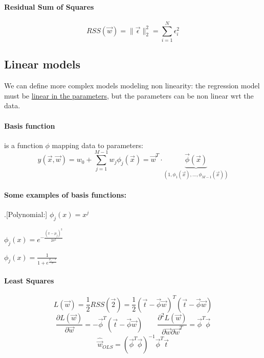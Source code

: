 \documentclass{article}
\begin{document}
\paragraph{Residual Sum of Squares}
\[
RSS(\vec{w})=\|\vec{\epsilon}\|_2^2=\sum_{i=1}^N \epsilon_i^2
\]
\subsection{Linear models}
We can define more complex models modeling non linearity: the regression model must be \underline{linear in  the parameters}, but the parameters can be non linear wrt the data.
\paragraph{Basis function} is a function $\phi$ mapping data to parameters:
\[
y(\vec{x},\vec{w})=
w_0
+\sum_{j=1}^{M-1} w_j\phi_j(\vec{x})
=\vec{w}^T \cdot \underbrace{\vec{\phi}(\vec{x})}_{(1,\phi_1(\vec{x}),...,\phi_{M-1}(\vec{x}))}
\]
\paragraph{Some examples of basis functions:}
\begin{description}
\item.[Polynomial:] $\phi_j(x)=x^j$
\item[Gaussian:] $\phi_j(x)=e^{-\frac{(x-\mu_j)^2}{2\sigma^2}}$
\item[Sigmoidal:] $\phi_j(x)=\frac{1}{1+e^{\frac{\mu_j-x}{\sigma}}}$
\end{description}
\paragraph{Least Squares}
\[
L(\vec{w})=\frac{1}{2}RSS(\vec{2})=\frac{1}{2}(\vec{t}-\vec{\phi}\vec{w})^T(\vec{t}-\vec{\phi}\vec{w})
\]
\[
\frac{\partial L(\vec{w})}{\partial \vec{w}}=-\vec{\phi}^T(\vec{t}-\vec{\phi}\vec{w})
\qquad
\frac{\partial^2 L(\vec{w})}{\partial \vec{w} \partial \vec{w}^T}=\vec{\phi}^T\vec{\phi}
\]
\[
\hat{\vec{w}}_{OLS}=\left(\vec{\phi}^T\vec{\phi}\right)^{-1}\vec{\phi}^T\vec{t}
\]
\end{document}

